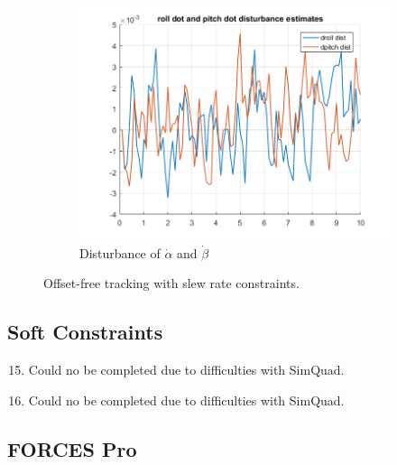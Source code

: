 \documentclass[11pt]{article}
\begin{document}
\begin{enumerate}
\begin{figure}[ht]
\begin{subfigure}[c]{0.3\linewidth}
            \includegraphics[width=\linewidth]{Plots_14_SlewRateConstraints/10}
            \caption{Disturbance of $\dot{\alpha}$ and $\dot{\beta}$}
        \end{subfigure}
        \caption{Offset-free tracking with slew rate constraints.}
        \label{fig:slew_rate}
\end{figure}
\end{enumerate}



\subsection*{Soft Constraints} %
\label{sub:soft_constraints}

\begin{enumerate}
    \setcounter{enumi}{14}
    \item Could no be completed due to difficulties with SimQuad.

    \item Could no be completed due to difficulties with SimQuad.

\end{enumerate}



\subsection*{FORCES Pro} %
\label{sub:forces_pro}
\end{document}
